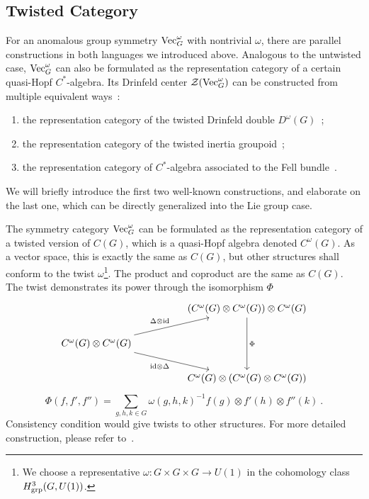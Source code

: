 \documentclass[a4paper,11pt]{article}
\newcommand{\be}{\begin{equation}}
\newcommand{\ee}{\end{equation}}
\def\CZ{\mathcal{Z}}
\def\vecgo{{\rm Vec}_G^\omega}
\begin{document}
\subsection{Twisted Category}
For an anomalous group symmetry $\vecgo$ with nontrivial $\omega$, there are parallel constructions in both languages we introduced above. Analogous to the untwisted case, $\vecgo$ can also be formulated as the representation category of a certain quasi-Hopf $C^*$-algebra. Its Drinfeld center $\CZ(\vecgo)$ can be constructed from multiple equivalent ways~\cite{Schauenburg:1999cnm,Bhowmick:2018}:
\begin{enumerate}
    \item the representation category of the twisted Drinfeld double $D^\omega (G)$~\cite{Roche:1990hs,Drinfeld:1989st};
    \item the representation category of the twisted inertia groupoid~\cite{Moerdijk:2002hiu};
    \item the representation category of $C^*$-algebra associated to the Fell bundle~\cite{Roy:2015}.
\end{enumerate}
We will briefly introduce the first two well-known constructions, and elaborate on the last one, which can be directly generalized into the Lie group case.

The symmetry category $\vecgo$ can be formulated as the representation category of a twisted version of $C(G)$, which is a quasi-Hopf algebra denoted $C^\omega(G)$. As a vector space, this is exactly the same as $C(G)$, but other structures shall conform to the twist $\omega$\footnote{We choose a representative $\omega:G\times G\times G\rightarrow U(1)$ in the cohomology class $H^3_{\rm grp}(G,U(1))$.}. The product and coproduct are the same as $C(G)$. The twist demonstrates its power through the isomorphism $\Phi$
\be
\begin{tikzcd}
&  & (C^\omega(G)\otimes C^\omega(G))\otimes C^\omega(G) \arrow[dd, "\Phi"] \\
C^\omega(G)\otimes C^\omega(G) \arrow[rrd, "{\rm id}\otimes \Delta"'] \arrow[rru, "\Delta \otimes {\rm id}"] &  &    \\
&  & C^\omega(G)\otimes (C^\omega(G)\otimes C^\omega(G))                   
\end{tikzcd}
\ee
\be
\Phi(f,f',f'') = \sum_{g,h,k\in G} \omega(g,h,k)^{-1} f(g) \otimes f'(h) \otimes f''(k) \ .
\ee
Consistency condition would give twists to other structures. For more detailed construction, please refer to~\cite{Roche:1990hs}.
\end{document}
